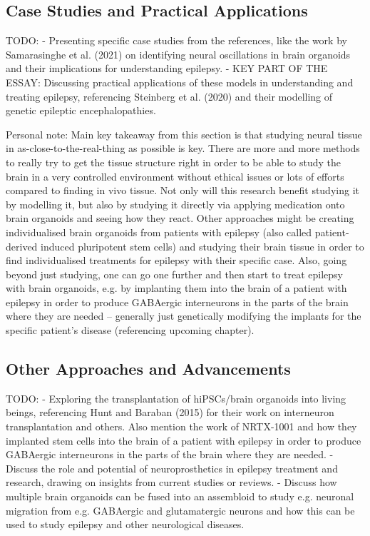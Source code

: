 \documentclass[10pt]{article}
\begin{document}
\begin{sloppypar}
  \subsection{Case Studies and Practical Applications}
  \label{sec:case-studies-and-practical-applications}

  TODO:
  - Presenting specific case studies from the references, like the work by Samarasinghe et al. (2021) on identifying neural oscillations in brain organoids and their implications for understanding epilepsy.
  - KEY PART OF THE ESSAY: Discussing practical applications of these models in understanding and treating epilepsy, referencing Steinberg et al. (2020) and their modelling of genetic epileptic encephalopathies.

  Personal note: Main key takeaway from this section is that studying neural tissue in as-close-to-the-real-thing as possible is key. There are more and more methods to really try to get the tissue structure right in order to be able to study the brain in a very controlled environment without ethical issues or lots of efforts compared to finding in vivo tissue. Not only will this research benefit studying it by modelling it, but also by studying it directly via applying medication onto brain organoids and seeing how they react. Other approaches might be creating individualised brain organoids from patients with epilepsy (also called patient-derived induced pluripotent stem cells) and studying their brain tissue in order to find individualised treatments for epilepsy with their specific case. Also, going beyond just studying, one can go one further and then start to treat epilepsy with brain organoids, e.g. by implanting them into the brain of a patient with epilepsy in order to produce GABAergic interneurons in the parts of the brain where they are needed – generally just genetically modifying the implants for the specific patient's disease (referencing upcoming chapter).

  \subsection{Other Approaches and Advancements}
  \label{sec:other-approaches-and-advancements}

  TODO:
  - Exploring the transplantation of hiPSCs/brain organoids into living beings, referencing Hunt and Baraban (2015) for their work on interneuron transplantation and others. Also mention the work of NRTX-1001 and how they implanted stem cells into the brain of a patient with epilepsy in order to produce GABAergic interneurons in the parts of the brain where they are needed.
  - Discuss the role and potential of neuroprosthetics in epilepsy treatment and research, drawing on insights from current studies or reviews.
  - Discuss how multiple brain organoids can be fused into an assembloid to study e.g. neuronal migration from e.g. GABAergic and glutamatergic neurons and how this can be used to study epilepsy and other neurological diseases.


\end{sloppypar}
\end{document}
